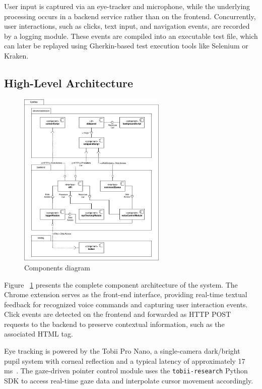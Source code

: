 User input is captured via an eye-tracker and microphone, while the underlying processing occurs in a backend service rather than on the frontend. Concurrently, user interactions, such as clicks, text input, and navigation events, are recorded by a logging module. These events are compiled into an executable test file, which can later be replayed using Gherkin-based test execution tools like Selenium\cite{garcia2024selenium} or Kraken\cite{ravelo2023kraken}.


\subsection{High-Level Architecture}

\begin{figure}
    \centering
    \includegraphics[width=200pt]{imgs/components-diagram.jpg}
    \caption{Components diagram}
    \vspace{-13pt}
    \label{fig:components-diagram}
\end{figure}

Figure ~\ref{fig:components-diagram} presents the complete component architecture of the system. The Chrome extension serves as the front-end interface, providing real-time textual feedback for recognized voice commands and capturing user interaction events. Click events are detected on the frontend and forwarded as HTTP POST requests to the backend to preserve contextual information, such as the associated HTML tag. 

Eye tracking is powered by the Tobii Pro Nano, a single-camera dark/bright pupil system with corneal reflection and a typical latency of approximately 17 ms~\cite{tobiiabndpronano}. The gaze-driven pointer control module uses the \verb|tobii-research| Python SDK to access real-time gaze data and interpolate cursor movement accordingly.


